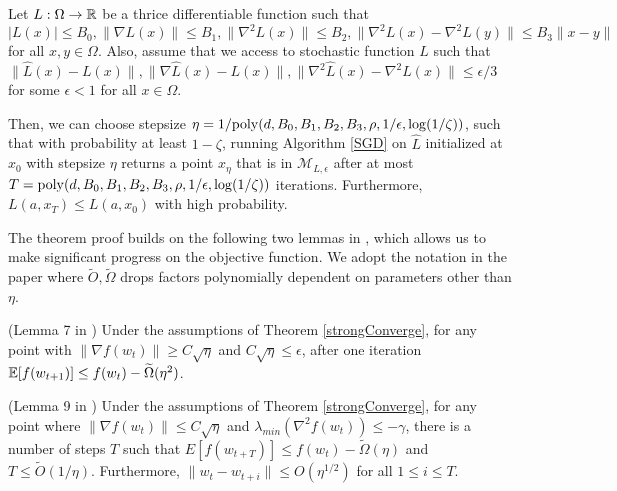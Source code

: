 \begin{theorem}\label{strongConverge}
  Let $L :\Omega \to {\mathbb{R}}$ be a thrice differentiable function such that
  $|L(x)| \leq B_0, \|\nabla L(x)\| \leq B_1, \|\nabla^2 L(x)\| \leq B_2,\|\nabla^2L(x)
  -\nabla^2L(y)\| \leq B_3\|x - y\|$
  for all $x,y\in\Omega$. Also, assume that we access to stochastic
  function $\widehat{L}$ such that
  $\|\widehat{L}(x) -L(x)\|, \|\nabla \widehat{L}(x) - L(x)\|,
  \|\nabla^2\widehat{L}(x) -\nabla^2 L(x)\| \leq \epsilon/3$
  for some $\epsilon < 1$ for all $x\in \Omega$.

Then, we can choose stepsize $\eta = 1/\mathrm{poly}(d,B_0, B_1, B_2, B_3,\rho,1/\epsilon,\log(1/\zeta))$, such that with probability at least $1-\zeta$, running Algorithm \ref{SGD} on $\widehat{L}$ initialized at $x_0$ with stepsize $\eta$  returns a point $x_\eta$ that is in $\mathcal{M}_{L, \epsilon}$ after at most $T = \mathrm{poly}(d,B_0, B_1, B_2, B_3,\rho,1/\epsilon, \log(1/\zeta))$ iterations. Furthermore, $L(a,x_T) \leq L(a, x_0)$ with high probability.
\end{theorem}

The theorem proof builds on the following two lemmas in\cite{GeHJY15} , which allows us to make significant progress on the objective function. We adopt the notation in the paper where $\widetilde{O}, \widetilde{\Omega}$ drops factors polynomially dependent on parameters other than $\eta$. 

\begin{lemma}(Lemma 7 in \cite{GeHJY15})\label{GeLem7}		
Under the assumptions of Theorem \ref{strongConverge}, for any point with $\|\nabla f (w_t) \|\geq C\sqrt{\eta}$ and $C\sqrt{\eta} \leq \epsilon$, after one iteration $\operatorname*{\mathbb{E}}[f(w_{t+1})] \leq f(w_t) - \widetilde{\Omega}(\eta^2)$.
\end{lemma}  

\begin{lemma}(Lemma 9 in \cite{GeHJY15})\label{GeLem9}
Under the assumptions of Theorem \ref{strongConverge}, for any point where $\|\nabla f(w_t)\|\leq C\sqrt{\eta}$ and $\lambda_{min}(\nabla^2 f (w_t)) \leq -\gamma$, there is a number of steps $T$ such that $E[f(w_{t+T})] \leq f(w_t) - \widetilde{\Omega}(\eta)$ and $T \leq \widetilde{O}(1/\eta)$. Furthermore, $\|w_t - w_{t+i}\| \leq O(\eta^{1/2})$ for all $1 \leq i \leq T$.
\end{lemma}

